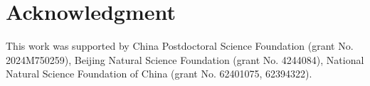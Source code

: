 \documentclass[conference]{IEEEtran}
\begin{document}





\section{Acknowledgment}

This work was supported by China Postdoctoral Science Foundation (grant No. 2024M750259), Beijing Natural Science Foundation (grant No. 4244084), National Natural Science Foundation of China (grant No. 62401075, 62394322).

\end{document}
